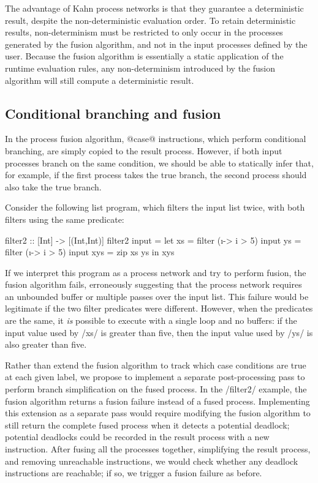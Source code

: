The advantage of Kahn process networks is that they guarantee a deterministic result, despite the non-deterministic evaluation order.
To retain deterministic results, non-determinism must be restricted to only occur in the processes generated by the fusion algorithm, and not in the input processes defined by the user.
Because the fusion algorithm is essentially a static application of the runtime evaluation rules, any non-determinism introduced by the fusion algorithm will still compute a deterministic result.

\subsection{Conditional branching and fusion}
In the process fusion algorithm, @case@ instructions, which perform conditional branching, are simply copied to the result process.
However, if both input processes branch on the same condition, we should be able to statically infer that, for example, if the first process takes the true branch, the second process should also take the true branch.

Consider the following list program, which filters the input list twice, with both filters using the same predicate:

\begin{haskell}
filter2 :: [Int] -> [(Int,Int)]
filter2 input =
 let xs  = filter (\i -> i > 5) input
     ys  = filter (\i -> i > 5) input
     xys = zip xs ys
 in  xys
\end{haskell}

If we interpret this program as a process network and try to perform fusion, the fusion algorithm fails, erroneously suggesting that the process network requires an unbounded buffer or multiple passes over the input list.
This failure would be legitimate if the two filter predicates were different.
However, when the predicates are the same, it \emph{is} possible to execute with a single loop and no buffers: if the input value used by \Hs/xs/ is greater than five, then the input value used by \Hs/ys/ is also greater than five.

Rather than extend the fusion algorithm to track which case conditions are true at each given label, we propose to implement a separate post-processing pass to perform branch simplification on the fused process.
In the \Hs/filter2/ example, the fusion algorithm returns a fusion failure instead of a fused process.
Implementing this extension as a separate pass would require modifying the fusion algorithm to still return the complete fused process when it detects a potential deadlock; potential deadlocks could be recorded in the result process with a new instruction.
After fusing all the processes together, simplifying the result process, and removing unreachable instructions, we would check whether any deadlock instructions are reachable; if so, we trigger a fusion failure as before.

